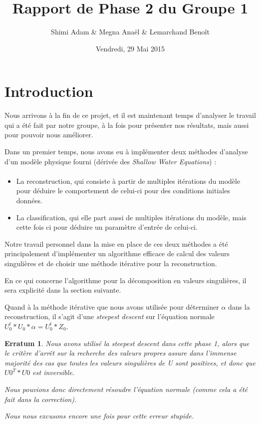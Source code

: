 \documentclass[a4paper,12pt]{article}
\title{\Huge\textbf{Rapport de Phase 2 du Groupe 1}}
\author{Shimi Adam \& Megna Anaël \& Lemarchand Benoît}
\date{Vendredi, 29 Mai 2015}
\newtheorem*{erratum}{Erratum}
\begin{document}
\begin{titlepage}
  \maketitle
  \thispagestyle{empty}
  \tableofcontents
\end{titlepage}

\section{Introduction}

    Nous arrivons à la fin de ce projet, et il est maintenant temps
    d'analyser le travail qui a été fait par notre groupe, à la fois
    pour présenter nos résultats, mais aussi pour pouvoir nous améliorer.

    Dans un premier temps, nous avons eu à implémenter deux méthodes
    d'analyse d'un modèle physique fourni (dérivée des \emph{Shallow Water
    Equations}) :

    \paragraph{}
    \begin{itemize}
        \item La reconstruction, qui consiste à partir de multiples itérations
        du modèle pour déduire le comportement de celui-ci pour des conditions
        initiales données.
        \item La classification, qui elle part aussi de multiples itérations
        du modèle, mais cette fois ci pour déduire un paramètre d'entrée de
        celui-ci.
    \end{itemize}

\bigskip

    Notre travail personnel dans la mise en place de ces deux méthodes
    a été principalement d'implémenter un algorithme efficace de calcul
    des valeurs singulières et de choisir une méthode itérative pour la
    reconstruction.

    En ce qui concerne l'algorithme pour la décomposition en valeurs
    singulières, il sera explicité dans la section suivante.

    Quand à la méthode itérative que nous avons utilisée pour
    déterminer $\alpha$ dans la reconstruction, il s'agit d'une
    \emph{steepest descent} sur l'équation normale $U_{0}^t*U_{0}*\alpha = U_{0}^t*Z_0$.

      \begin{erratum}Nous avons utilisé la \emph{steepest descent} dans
    cette phase 1, alors que le critère d'arrêt sur la recherche
    des valeurs propres assure dans l'immense majorité des cas
    que toutes les valeurs singulières de U sont positives, et
    donc que $U0^T*U0$ est inversible.

    Nous pouvions donc directement résoudre l'équation normale
    (comme cela a été fait dans la correction).

    Nous nous excusons encore une fois pour cette erreur stupide.
    \end{erratum}
\end{document}
